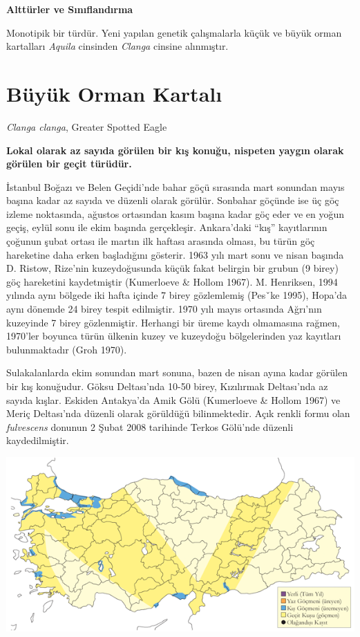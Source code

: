 \documentclass[
  letterpaper,
  DIV=11,
  numbers=noendperiod]{scrreprt}
\begin{document}
\textbf{Alttürler ve Sınıflandırma}

Monotipik bir türdür. Yeni yapılan genetik çalışmalarla küçük ve büyük
orman kartalları \emph{Aquila} cinsinden \emph{Clanga} cinsine
alınmıştır.

\section{Büyük Orman Kartalı}\label{buxfcyuxfck-orman-kartalux131}

\emph{Clanga clanga}, Greater Spotted Eagle

\textbf{Lokal olarak az sayıda görülen bir kış konuğu, nispeten yaygın
olarak görülen bir geçit türüdür.}

İstanbul Boğazı ve Belen Geçidi'nde bahar göçü sırasında mart sonundan
mayıs başına kadar az sayıda ve düzenli olarak görülür. Sonbahar göçünde
ise üç göç izleme noktasında, ağustos ortasından kasım başına kadar göç
eder ve en yoğun geçiş, eylül sonu ile ekim başında gerçekleşir.
Ankara'daki ``kış'' kayıtlarının çoğunun şubat ortası ile martın ilk
haftası arasında olması, bu türün göç hareketine daha erken başladığını
gösterir. 1963 yılı mart sonu ve nisan başında D. Ristow, Rize'nin
kuzeydoğusunda küçük fakat belirgin bir grubun (9 birey) göç hareketini
kaydetmiştir (Kumerloeve \& Hollom 1967). M. Henriksen, 1994 yılında
aynı bölgede iki hafta içinde 7 birey gözlemlemiş (Pesˇke 1995), Hopa'da
aynı dönemde 24 birey tespit edilmiştir. 1970 yılı mayıs ortasında
Ağrı'nın kuzeyinde 7 birey gözlenmiştir. Herhangi bir üreme kaydı
olmamasına rağmen, 1970'ler boyunca türün ülkenin kuzey ve kuzeydoğu
bölgelerinden yaz kayıtları bulunmaktadır (Groh 1970).

Sulakalanlarda ekim sonundan mart sonuna, bazen de nisan ayına kadar
görülen bir kış konuğudur. Göksu Deltası'nda 10-50 birey, Kızılırmak
Deltası'nda az sayıda kışlar. Eskiden Antakya'da Amik Gölü (Kumerloeve
\& Hollom 1967) ve Meriç Deltası'nda düzenli olarak görüldüğü
bilinmektedir. Açık renkli formu olan \emph{fulvescens} donunun 2 Şubat
2008 tarihinde Terkos Gölü'nde düzenli kaydedilmiştir.

\includegraphics{images/harita_Page_092.png}
\end{document}
